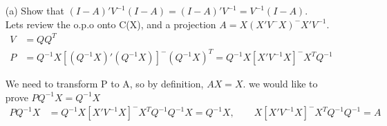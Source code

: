 \begin{itemize}
    \item [(a)] Show that $(I-A)'V^{-1}(I-A) = (I-A)'V^{-1} = V^{-1}(I-A)$. \\
    Lets review the o.p.o onto C(X), and a projection $A =X(X'V^-X)^-X'V^{-1}$.
\begin{align*}
 V &= QQ^{T}\\
 P &= Q^{-1}X [(Q^{-1}X)' (Q^{-1}X)]^{-} (Q^{-1}X)^{T} = Q^{-1}X [X' V^{-1}X]^- X^{T} Q^{-1} 
\end{align*}     

We need to transform P to A, so by definition, $AX = X$. we would like to prove $ P Q^{-1}X = Q^{-1}X$
\begin{align*}
 P Q^{-1}X &=Q^{-1}X [X' V^{-1}X]^{-} X^T Q^{-1} Q^{-1}X = Q^{-1}X, \qquad X [X' V^{-1}X]^{-} X^T Q^{-1} Q^{-1} = A
\end{align*}  


\end{itemize}
